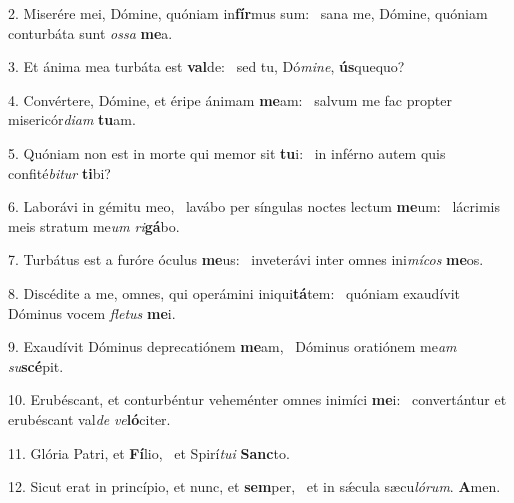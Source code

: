 2. Miserére mei, Dómine, quóniam in\textbf{fír}mus sum: \ast\  sana me, Dómine, quóniam conturbáta sunt \textit{os}\textit{sa} \textbf{me}a.\

3. Et ánima mea turbáta est \textbf{val}de: \ast\  sed tu, Dó\textit{mi}\textit{ne}, \textbf{ús}quequo?\

4. Convértere, Dómine, et éripe ánimam \textbf{me}am: \ast\  salvum me fac propter misericór\textit{di}\textit{am} \textbf{tu}am.\

5. Quóniam non est in morte qui memor sit \textbf{tu}i: \ast\  in inférno autem quis confité\textit{bi}\textit{tur} \textbf{ti}bi?\

6. Laborávi in gémitu meo, \dag\  lavábo per síngulas noctes lectum \textbf{me}um: \ast\  lácrimis meis stratum me\textit{um} \textit{ri}\textbf{gá}bo.\

7. Turbátus est a furóre óculus \textbf{me}us: \ast\  inveterávi inter omnes ini\textit{mí}\textit{cos} \textbf{me}os.\

8. Discédite a me, omnes, qui operámini iniqui\textbf{tá}tem: \ast\  quóniam exaudívit Dóminus vocem \textit{fle}\textit{tus} \textbf{me}i.\

9. Exaudívit Dóminus deprecatiónem \textbf{me}am, \ast\  Dóminus oratiónem me\textit{am} \textit{su}\textbf{scé}pit.\

10. Erubéscant, et conturbéntur veheménter omnes inimíci \textbf{me}i: \ast\  convertántur et erubéscant val\textit{de} \textit{ve}\textbf{ló}citer.\

11. Glória Patri, et \textbf{Fí}lio, \ast\  et Spirí\textit{tu}\textit{i} \textbf{Sanc}to.\

12. Sicut erat in princípio, et nunc, et \textbf{sem}per, \ast\  et in sǽcula sæcu\textit{ló}\textit{rum}. \textbf{A}men.\

